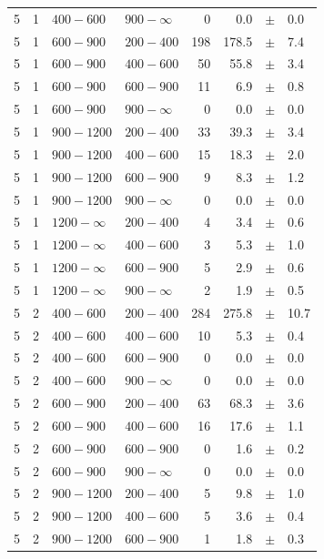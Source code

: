 \begin{table}[!h]
\begin{tabular}{rrllrrcl}
5 & 1 & $ 400- 600$ & $900-\infty$ &      0 &      0.0 &$\pm$&    0.0 \\
5 & 1 & $ 600- 900$ & $200-400$ &    198 &    178.5 &$\pm$&    7.4 \\
5 & 1 & $ 600- 900$ & $400-600$ &     50 &     55.8 &$\pm$&    3.4 \\
5 & 1 & $ 600- 900$ & $600-900$ &     11 &      6.9 &$\pm$&    0.8 \\
5 & 1 & $ 600- 900$ & $900-\infty$ &      0 &      0.0 &$\pm$&    0.0 \\
5 & 1 & $ 900-1200$ & $200-400$ &     33 &     39.3 &$\pm$&    3.4 \\
5 & 1 & $ 900-1200$ & $400-600$ &     15 &     18.3 &$\pm$&    2.0 \\
5 & 1 & $ 900-1200$ & $600-900$ &      9 &      8.3 &$\pm$&    1.2 \\
5 & 1 & $ 900-1200$ & $900-\infty$ &      0 &      0.0 &$\pm$&    0.0 \\
5 & 1 & $1200- \infty$ & $200-400$ &      4 &      3.4 &$\pm$&    0.6 \\
5 & 1 & $1200- \infty$ & $400-600$ &      3 &      5.3 &$\pm$&    1.0 \\
5 & 1 & $1200- \infty$ & $600-900$ &      5 &      2.9 &$\pm$&    0.6 \\
5 & 1 & $1200- \infty$ & $900-\infty$ &      2 &      1.9 &$\pm$&    0.5 \\
5 & 2 & $ 400- 600$ & $200-400$ &    284 &    275.8 &$\pm$&   10.7 \\
5 & 2 & $ 400- 600$ & $400-600$ &     10 &      5.3 &$\pm$&    0.4 \\
5 & 2 & $ 400- 600$ & $600-900$ &      0 &      0.0 &$\pm$&    0.0 \\
5 & 2 & $ 400- 600$ & $900-\infty$ &      0 &      0.0 &$\pm$&    0.0 \\
5 & 2 & $ 600- 900$ & $200-400$ &     63 &     68.3 &$\pm$&    3.6 \\
5 & 2 & $ 600- 900$ & $400-600$ &     16 &     17.6 &$\pm$&    1.1 \\
5 & 2 & $ 600- 900$ & $600-900$ &      0 &      1.6 &$\pm$&    0.2 \\
5 & 2 & $ 600- 900$ & $900-\infty$ &      0 &      0.0 &$\pm$&    0.0 \\
5 & 2 & $ 900-1200$ & $200-400$ &      5 &      9.8 &$\pm$&    1.0 \\
5 & 2 & $ 900-1200$ & $400-600$ &      5 &      3.6 &$\pm$&    0.4 \\
5 & 2 & $ 900-1200$ & $600-900$ &      1 &      1.8 &$\pm$&    0.3 \\

\end{tabular}
\end{table}
